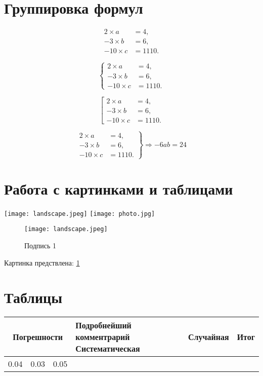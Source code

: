 \documentclass[a4paper,12pt]{article}
\begin{document}
\section{Группировка формул}


\begin{equation}
\begin{aligned}
2 \times a &= 4,\\
-3 \times b &= 6, \\
-10 \times c &= 1110.
\end{aligned}
\end{equation}


\[ \left\{
\begin{aligned}
2 \times a &= 4,\\
-3 \times b &= 6, \\
-10 \times c &= 1110.
\end{aligned} \right. 
\]

\[ \left[
\begin{aligned}
2 \times a &= 4,\\
-3 \times b &= 6, \\
-10 \times c &= 1110.
\end{aligned} \right.
\]


\[ \left.
\begin{aligned}
2 \times a &= 4,\\
-3 \times b &= 6, \\
-10 \times c &= 1110.
\end{aligned} \right\} \Rightarrow -6ab=24
\]



\section{Работа с картинками и таблицами}


\texttt{[image: landscape.jpeg]}
\texttt{[image: photo.jpg]}


\begin{figure}

\begin{center}
\texttt{[image: landscape.jpeg]}
\end{center}
\caption{Подпись 1} \label{landscape}

\end{figure}

Картинка предствлена: \ref{landscape}

	
\section{Таблицы}

\begin{right}

\begin{tabular}{|c|c|r|p{5cm}r|}
\hline
\multicolumn{3}{|c|}{Погрешности} & Подробнейший комментрарий
\hline
Систематическая & Случайная & Итог & \\
\hline
0.04 & 0.03 & 0.05 & \\
\hline
\end{tabular}

\end{right}
\end{document}
